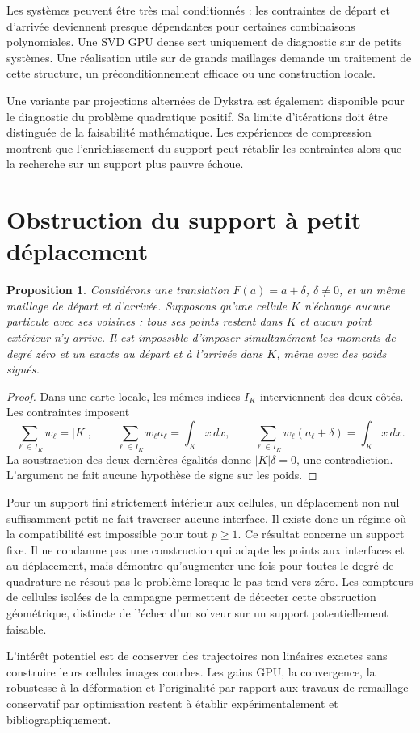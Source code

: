\documentclass[11pt,a4paper]{article}
\newtheorem{proposition}{Proposition}
\begin{document}
Les systèmes peuvent être très mal conditionnés : les contraintes de départ
et d'arrivée deviennent presque dépendantes pour certaines combinaisons
polynomiales. Une SVD GPU dense sert uniquement de diagnostic sur de petits
systèmes. Une réalisation utile sur de grands maillages demande un traitement
de cette structure, un préconditionnement efficace ou une construction locale.

Une variante par projections alternées de Dykstra est également disponible
pour le diagnostic du problème quadratique positif. Sa limite d'itérations
doit être distinguée de la faisabilité mathématique. Les expériences de
compression montrent que l'enrichissement du support peut rétablir les
contraintes alors que la recherche sur un support plus pauvre échoue.

\section{Obstruction du support à petit déplacement}
\begin{proposition}
Considérons une translation $F(a)=a+\delta$, $\delta\ne0$, et un même
maillage de départ et d'arrivée. Supposons qu'une cellule $K$ n'échange
aucune particule avec ses voisines : tous ses points restent dans $K$ et
aucun point extérieur n'y arrive. Il est impossible d'imposer simultanément
les moments de degré zéro et un exacts au départ et à l'arrivée dans $K$,
même avec des poids signés.
\end{proposition}
\begin{proof}
Dans une carte locale, les mêmes indices $I_K$ interviennent des deux côtés.
Les contraintes imposent
\[
 \sum_{\ell\in I_K}w_\ell=|K|,\qquad
 \sum_{\ell\in I_K}w_\ell a_\ell=\int_K x\,dx,
 \qquad
 \sum_{\ell\in I_K}w_\ell(a_\ell+\delta)=\int_K x\,dx.
\]
La soustraction des deux dernières égalités donne $|K|\delta=0$, une
contradiction. L'argument ne fait aucune hypothèse de signe sur les poids.
\end{proof}
Pour un support fini strictement intérieur aux cellules, un déplacement
non nul suffisamment petit ne fait traverser aucune interface. Il existe
donc un régime où la compatibilité est impossible pour tout $p\geq1$.
Ce résultat concerne un support fixe. Il ne condamne pas une construction
qui adapte les points aux interfaces et au déplacement, mais démontre
qu'augmenter une fois pour toutes le degré de quadrature ne résout pas le
problème lorsque le pas tend vers zéro. Les compteurs de cellules isolées
de la campagne permettent de détecter cette obstruction géométrique,
distincte de l'échec d'un solveur sur un support potentiellement faisable.

L'intérêt potentiel est de conserver des trajectoires non linéaires exactes
sans construire leurs cellules images courbes. Les gains GPU, la convergence,
la robustesse à la déformation et l'originalité par rapport aux travaux de
remaillage conservatif par optimisation restent à établir expérimentalement
et bibliographiquement.
\end{document}
